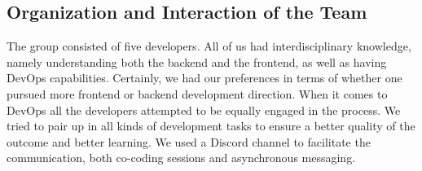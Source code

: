 \subsection{Organization and Interaction of the Team}

The group consisted of five developers. All of us had interdisciplinary knowledge, namely understanding both the backend and the frontend, as well as having DevOps capabilities. Certainly, we had our preferences in terms of whether one pursued more frontend or backend development direction. When it comes to DevOps all the developers attempted to be equally engaged in the process. We tried to pair up in all kinds of development tasks to ensure a better quality of the outcome and better learning. We used a Discord channel to facilitate the communication, both co-coding sessions and asynchronous messaging.